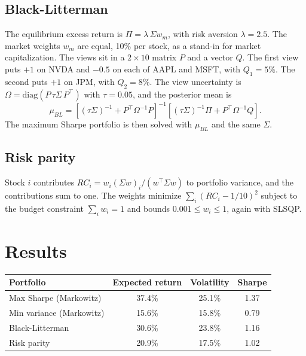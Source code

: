 \documentclass[11pt,a4paper]{article}
\begin{document}
\subsection{Black-Litterman}
The equilibrium excess return is $\Pi=\lambda\,\Sigma w_m$, with risk aversion $\lambda=2.5$. The market weights $w_m$ are equal, 10\% per stock, as a stand-in for market capitalization. The views sit in a $2\times 10$ matrix $P$ and a vector $Q$. The first view puts $+1$ on NVDA and $-0.5$ on each of AAPL and MSFT, with $Q_1=5\%$. The second puts $+1$ on JPM, with $Q_2=8\%$. The view uncertainty is $\Omega=\mathrm{diag}(P\,\tau\Sigma\,P^\top)$ with $\tau=0.05$, and the posterior mean is
\[
\mu_{BL}=\left[(\tau\Sigma)^{-1}+P^\top\Omega^{-1}P\right]^{-1}\left[(\tau\Sigma)^{-1}\Pi+P^\top\Omega^{-1}Q\right].
\]
The maximum Sharpe portfolio is then solved with $\mu_{BL}$ and the same $\Sigma$.

\subsection{Risk parity}
Stock $i$ contributes $RC_i = w_i(\Sigma w)_i / (w^\top\Sigma w)$ to portfolio variance, and the contributions sum to one. The weights minimize $\sum_i (RC_i-1/10)^2$ subject to the budget constraint $\sum_i w_i=1$ and bounds $0.001\le w_i\le 1$, again with SLSQP.

\section{Results}
\begin{center}
\begin{tabular}{@{}lccc@{}}
\toprule
Portfolio & Expected return & Volatility & Sharpe \\
\midrule
Max Sharpe (Markowitz) & 37.4\% & 25.1\% & 1.37 \\
Min variance (Markowitz) & 15.6\% & 15.8\% & 0.79 \\
Black-Litterman & 30.6\% & 23.8\% & 1.16 \\
Risk parity & 20.9\% & 17.5\% & 1.02 \\
\bottomrule
\end{tabular}
\end{center}
\end{document}
